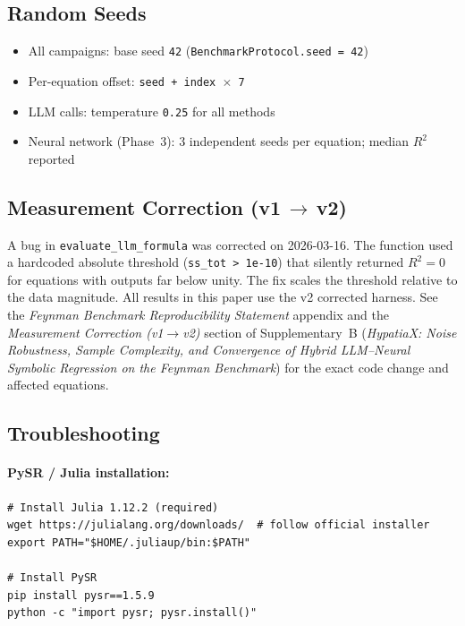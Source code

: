 \documentclass[twoside,11pt]{article}
\begin{document}
\subsection{Random Seeds}

\begin{itemize}
\item All campaigns: base seed \texttt{42} (\texttt{BenchmarkProtocol.seed = 42})
\item Per-equation offset: \texttt{seed + index $\times$ 7}
\item LLM calls: temperature \texttt{0.25} for all methods
\item Neural network (Phase~3): 3 independent seeds per equation; median $R^2$ reported
\end{itemize}

\subsection{Measurement Correction (v1\,$\to$\,v2)}

A bug in \texttt{evaluate\_llm\_formula} was corrected on 2026-03-16.
The function used a hardcoded absolute threshold (\texttt{ss\_tot > 1e-10})
that silently returned $R^2=0$ for equations with outputs far below unity.
The fix scales the threshold relative to the data magnitude.
All results in this paper use the v2 corrected harness.
See the \emph{Feynman Benchmark Reproducibility Statement} appendix and the
\emph{Measurement Correction (v1$\to$v2)} section of Supplementary~B
(\emph{HypatiaX: Noise Robustness, Sample Complexity, and Convergence of
Hybrid LLM--Neural Symbolic Regression on the Feynman Benchmark}) for the
exact code change and affected equations.

\subsection{Troubleshooting}

\paragraph{PySR / Julia installation:}
\begin{small}
\begin{verbatim}
# Install Julia 1.12.2 (required)
wget https://julialang.org/downloads/  # follow official installer
export PATH="$HOME/.juliaup/bin:$PATH"

# Install PySR
pip install pysr==1.5.9
python -c "import pysr; pysr.install()"
\end{verbatim}
\end{small}
\end{document}
